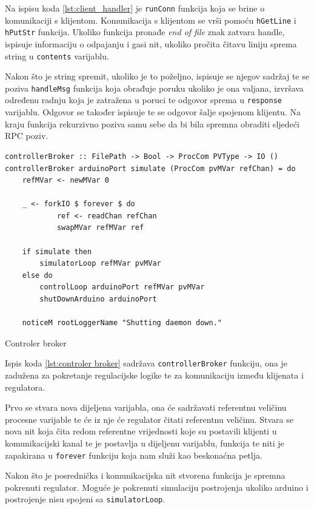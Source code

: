 Na ispisu koda \ref{lst:client_handler} je \texttt{runConn}
funkcija koja se brine o komunikaciji s klijentom. Komunikacija s klijentom se
vrši pomoću \texttt{hGetLine} i
\texttt{hPutStr} funkcija. Ukoliko funkcija pronađe \emph{end of
file} znak zatvara handle, ispisuje informaciju o odpajanju i gasi nit, ukoliko
pročita čitavu liniju sprema string u \texttt{contents} varijablu.

Nakon što je string spremit, ukoliko je to poželjno, ispisuje se njegov sadržaj
te se poziva \texttt{handleMsg} funkcija koja obrađuje poruku
ukoliko je ona valjana, izvršava određenu radnju koja je zatražena u poruci te
odgovor sprema u \texttt{response} varijablu. Odgovor se također
ispisuje te se odgovor šalje spojenom klijentu. Na kraju funkcija rekurzivno
poziva samu sebe da bi bila spremna obraditi sljedeći RPC poziv.

\begin{listing}[H]
\centering
\begin{verbatim}
controllerBroker :: FilePath -> Bool -> ProcCom PVType -> IO ()
controllerBroker arduinoPort simulate (ProcCom pvMVar refChan) = do
    refMVar <- newMVar 0

    _ <- forkIO $ forever $ do
            ref <- readChan refChan
            swapMVar refMVar ref

    if simulate then
        simulatorLoop refMVar pvMVar
    else do
        controlLoop arduinoPort refMVar pvMVar
        shutDownArduino arduinoPort

    noticeM rootLoggerName "Shutting daemon down."
\end{verbatim}
\caption{Controler broker}
\label{lst:controler broker}
\end{listing}

Ispis koda \ref{lst:controler broker} sadržava
\texttt{controllerBroker} funkciju, ona je zadužena za pokretanje
regulacijske logike te za komunikaciju između klijenata i regulatora.

Prvo se stvara nova dijeljena varijabla, ona će sadržavati referentnu veličinu
procesne varijable te će iz nje će regulator čitati referentnu veličinu. Stvara
se nova nit koja čita redom referentne vrijednosti koje su postavili klijenti u
komunikacijski kanal te je postavlja u dijeljenu varijablu, funkcija te niti
je zapakirana u \texttt{forever} funkciju koja nam služi kao
beskonaćna petlja.

Nakon što je posrednička i komunikacijska nit stvorena funkcija je spremna
pokrenuti regulator. Moguće je pokrenuti simulaciju postrojenja ukoliko arduino
i postrojenje nisu spojeni sa \texttt{simulatorLoop}.

